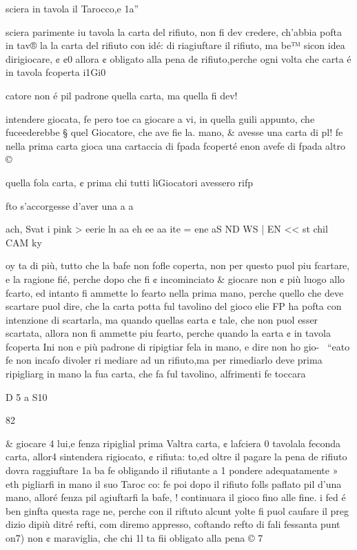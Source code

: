 \documentclass[11pt,a6paper]{article}
\begin{document}
sciera in tavola il Tarocco,e 1a”

sciera parimente iu tavola la
carta del rifiuto, non fi dev
credere, ch’abbia pofta in tav®
la la carta del rifiuto con idé:
di riagiuftare il rifiuto, ma be™
sicon idea dirigiocare, ¢ ¢0%
allora ¢ obligato alla pena d¢
rifiuto,perche ogni volta che
carta é in tavola fcoperta i1Gi0

catore non é pil padrone
quella carta, ma quella fi dev!

intendere giocata, fe pero toe
ca giocare a vi, in quella guili
appunto, che fuceederebbe §
quel Giocatore, che ave fie la.
mano, & avesse una carta di pl!
fe nella prima carta gioca
una cartaccia di fpada fcoperté
enon avefe di fpada altro ©

quella fola carta, ¢ prima chi
tutti liGiocatori avessero rifp

fto s’accorgesse d’aver una a
a

 
 

ach, Svat i pink > eerie ln aa eh ee aa ite = ene aS ND WS | EN << st chil CAM ky

oy
ta di più, tutto che la bafe non
fofle coperta, non per questo
puol piu fcartare, e la ragione
fié, perche dopo che fi ¢ incominciato & giocare non ¢ più
luogo allo fcarto, ed intanto fi
ammette lo fearto nella prima
mano, perche quello che deve
scartare puol dire, che la carta
potta ful tavolino del gioco elie
FP ha pofta con intenzione di
scartarla, ma quando quellas
earta ¢ tale, che non puol esser
scartata, allora non fi ammette
piu fearto, perche quando la
earta ¢ in tavola fcoperta Ini
non e più padrone di ripigtiar
fela in mano, e dire non ho gio-~
“eato fe non incafo divoler ri
mediare ad un rifiuto,ma per rimediarlo deve prima ripigliarg
in mano la fua carta, che fa ful
tavolino, alfrimenti fe toccara

D 5 a S10

 

 

 
 

 

 

 

 

82

& giocare 4 lui,e fenza ripiglial
prima Valtra carta, ¢ lafciera 0
tavolala feconda carta, allor4
sintendera rigiocato, ¢ rifiuta:
to,ed oltre il pagare la pena de
rifiuto dovra raggiuftare 1a ba
fe obligando il rifiutante a 1%
pondere adequatamente » eth
pigliarfi in mano il suo Taroc
co: fe poi dopo il rifiuto folls
paflato pil d’una mano, alloré
fenza pil agiuftarfi la bafe, !
continuara il gioco fino alle
fine. i
fed é ben ginfta questa rage
ne, perche con il riftuto alcunt
yolte fi puol caufare il preg
dizio dipiù ditré refti, com
diremo appresso, coftando
refto di fali fessanta punt on7)
non ¢ maraviglia, che chi 1l
ta fii obligato alla pena © 7
\end{document}
